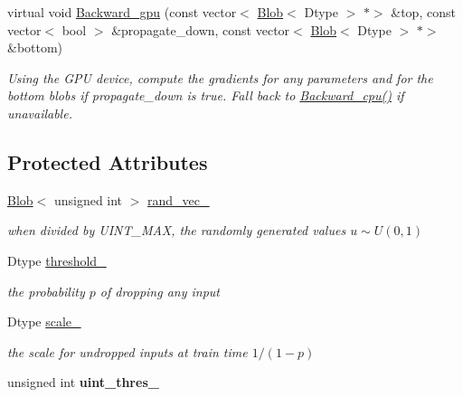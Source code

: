 \begin{DoxyCompactItemize}
virtual void \mbox{\hyperlink{classcaffe_1_1_dropout_layer_a018a322f4e9e2604d9d55d9c85512600}{Backward\+\_\+gpu}} (const vector$<$ \mbox{\hyperlink{classcaffe_1_1_blob}{Blob}}$<$ Dtype $>$ $\ast$$>$ \&top, const vector$<$ bool $>$ \&propagate\+\_\+down, const vector$<$ \mbox{\hyperlink{classcaffe_1_1_blob}{Blob}}$<$ Dtype $>$ $\ast$$>$ \&bottom)
\begin{DoxyCompactList}\small\item\em Using the G\+PU device, compute the gradients for any parameters and for the bottom blobs if propagate\+\_\+down is true. Fall back to \mbox{\hyperlink{classcaffe_1_1_dropout_layer_afd94f3c55768f4847956c01bce88f9c1}{Backward\+\_\+cpu()}} if unavailable. \end{DoxyCompactList}\end{DoxyCompactItemize}
\subsection*{Protected Attributes}
\begin{DoxyCompactItemize}
\item 
\mbox{\label{classcaffe_1_1_dropout_layer_a10b5b699a7c34c7b71a64e3fd49f887a}} 
\mbox{\hyperlink{classcaffe_1_1_blob}{Blob}}$<$ unsigned int $>$ \mbox{\hyperlink{classcaffe_1_1_dropout_layer_a10b5b699a7c34c7b71a64e3fd49f887a}{rand\+\_\+vec\+\_\+}}
\begin{DoxyCompactList}\small\item\em when divided by U\+I\+N\+T\+\_\+\+M\+AX, the randomly generated values $u\sim U(0,1)$ \end{DoxyCompactList}\item 
\mbox{\label{classcaffe_1_1_dropout_layer_a8e9d88e6128a97101c27ce8a11158ca6}} 
Dtype \mbox{\hyperlink{classcaffe_1_1_dropout_layer_a8e9d88e6128a97101c27ce8a11158ca6}{threshold\+\_\+}}
\begin{DoxyCompactList}\small\item\em the probability $ p $ of dropping any input \end{DoxyCompactList}\item 
\mbox{\label{classcaffe_1_1_dropout_layer_ac8702c053de0fea389f5a0ded8cdc544}} 
Dtype \mbox{\hyperlink{classcaffe_1_1_dropout_layer_ac8702c053de0fea389f5a0ded8cdc544}{scale\+\_\+}}
\begin{DoxyCompactList}\small\item\em the scale for undropped inputs at train time $ 1 / (1 - p) $ \end{DoxyCompactList}\item 
\mbox{\label{classcaffe_1_1_dropout_layer_ae8ba2b98a7bc12643eec8ad72a66be21}} 
unsigned int {\bfseries uint\+\_\+thres\+\_\+}
\end{DoxyCompactItemize}



